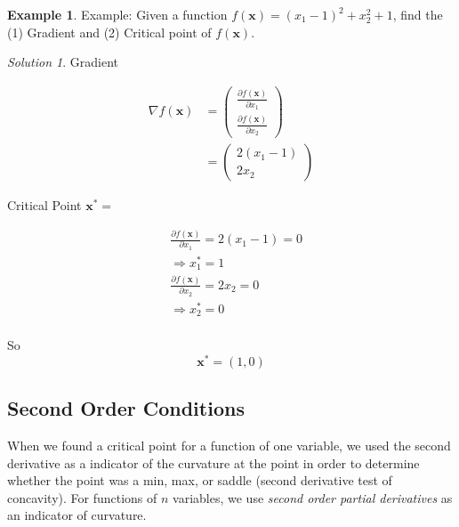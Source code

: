 \documentclass[
]{book}
\theoremstyle{definition}
\theoremstyle{definition}
\newtheorem{example}{Example}[chapter]
\theoremstyle{definition}
\theoremstyle{remark}
\newtheorem*{solution}{Solution}
\begin{document}
\begin{example}
\protect\hypertarget{exm:unnamed-chunk-54}{}{\label{exm:unnamed-chunk-54} }
Example: Given a function \(f(\mathbf{x})=(x_1-1)^2+x_2^2+1\), find the (1) Gradient and (2) Critical point of \(f(\mathbf{x})\).
\end{example}

\begin{solution}
{}Gradient

\begin{align*}
\nabla f(\mathbf{x}) &= \begin{pmatrix}\frac{\partial f(\mathbf{x})}{\partial x_1}\\ \frac{\partial f(\mathbf{x})}{\partial x_2} \end{pmatrix}\\
&= \begin{pmatrix} 2(x_1-1)\\ 2x_2 \end{pmatrix}
\end{align*}

Critical Point \(\mathbf{x}^* =\)

\begin{align*}
&\frac{\partial f(\mathbf{x})}{\partial x_1} = 2(x_1-1) = 0\\
&\Rightarrow x_1^* = 1\\
&\frac{\partial f(\mathbf{x})}{\partial x_2} = 2x_2 = 0\\
&\Rightarrow   x_2^* = 0\\
\end{align*}

So \[\mathbf{x}^* = (1,0)\]
\end{solution}

\hypertarget{second-order-conditions}{%
\subsection*{Second Order Conditions}\label{second-order-conditions}}

When we found a critical point for a function of one variable, we used the second derivative as a indicator of the curvature at the point in order to determine whether the point was a min, max, or saddle (second derivative test of concavity). For functions of \(n\) variables, we use \emph{second order partial derivatives} as an indicator of curvature.
\end{document}
